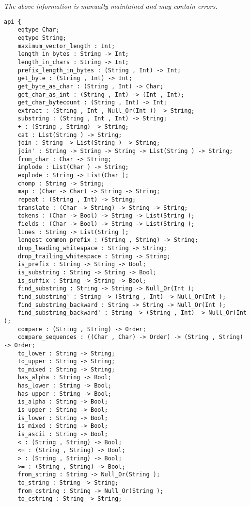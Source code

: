 \label{api:String}

{\tiny \it The above information is manually maintained and may contain errors.}
\begin{verbatim}
api {
    eqtype Char;
    eqtype String;
    maximum_vector_length : Int;
    length_in_bytes : String -> Int;
    length_in_chars : String -> Int;
    prefix_length_in_bytes : (String , Int) -> Int;
    get_byte : (String , Int) -> Int;
    get_byte_as_char : (String , Int) -> Char;
    get_char_as_int : (String , Int) -> (Int , Int);
    get_char_bytecount : (String , Int) -> Int;
    extract : (String , Int , Null_Or(Int )) -> String;
    substring : (String , Int , Int) -> String;
    + : (String , String) -> String;
    cat : List(String ) -> String;
    join : String -> List(String ) -> String;
    join' : String -> String -> String -> List(String ) -> String;
    from_char : Char -> String;
    implode : List(Char ) -> String;
    explode : String -> List(Char );
    chomp : String -> String;
    map : (Char -> Char) -> String -> String;
    repeat : (String , Int) -> String;
    translate : (Char -> String) -> String -> String;
    tokens : (Char -> Bool) -> String -> List(String );
    fields : (Char -> Bool) -> String -> List(String );
    lines : String -> List(String );
    longest_common_prefix : (String , String) -> String;
    drop_leading_whitespace : String -> String;
    drop_trailing_whitespace : String -> String;
    is_prefix : String -> String -> Bool;
    is_substring : String -> String -> Bool;
    is_suffix : String -> String -> Bool;
    find_substring : String -> String -> Null_Or(Int );
    find_substring' : String -> (String , Int) -> Null_Or(Int );
    find_substring_backward : String -> String -> Null_Or(Int );
    find_substring_backward' : String -> (String , Int) -> Null_Or(Int );
    compare : (String , String) -> Order;
    compare_sequences : ((Char , Char) -> Order) -> (String , String) -> Order;
    to_lower : String -> String;
    to_upper : String -> String;
    to_mixed : String -> String;
    has_alpha : String -> Bool;
    has_lower : String -> Bool;
    has_upper : String -> Bool;
    is_alpha : String -> Bool;
    is_upper : String -> Bool;
    is_lower : String -> Bool;
    is_mixed : String -> Bool;
    is_ascii : String -> Bool;
    < : (String , String) -> Bool;
    <= : (String , String) -> Bool;
    > : (String , String) -> Bool;
    >= : (String , String) -> Bool;
    from_string : String -> Null_Or(String );
    to_string : String -> String;
    from_cstring : String -> Null_Or(String );
    to_cstring : String -> String;

\end{verbatim}
